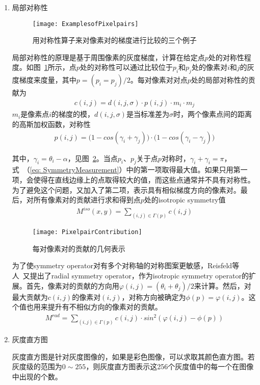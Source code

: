 \begin{enumerate}

\item 局部对称性

\begin{figure}[!ht]
 \centering
 \texttt{[image: ExamplesofPixelpairs]}
\caption{用对称性算子来对像素对的梯度进行比较的三个例子}
\label{fig: ExamplesofPixelpairs}
\end{figure}

局部对称性的原理是基于周围像素的灰度梯度，计算在给定点$p$处的对称性程度。如图~\ref{fig: ExamplesofPixelpairs}所示，点$p$处的对称性可以通过比较位于$p_i$和$p_j$处的像素对$i$和$j$的灰度梯度来度量，其中$p = (p_i  = p_j)/2$。每对像素对对点$p$处的局部对称性的贡献为
\begin{align}
c(i, j) = d(i, j, \sigma) \cdot p(i, j) \cdot m_i \cdot m_j
\end{align}
$m_i$是像素点$i$的梯度的模，$d(i, j, \sigma)$是当标准差为$\sigma$时，两个像素点间的距离的高斯加权函数，对称性
\begin{align}
p(i, j) = \Big(1-cos(\gamma_i+\gamma_j)\Big)\cdot \Big(1-cos(\gamma_i-\gamma_j)\Big)
\label{eq: SymmetryMeasurement}
\end{align}

其中，$\gamma_i = \theta_i-\alpha$，见图~\ref{fig: PixelpairContribution}。当点$p_i$、$p_j$关于点$p$对称时，$\gamma_i+\gamma_i=\pi$，式~（\ref{eq: SymmetryMeasurement}）中的第一项取得最大值。如果只用第一项，会使得在直线边缘上的点取得较大的值，而这些点通常并不具有对称性。为了避免这个问题，又加入了第二项，表示具有相似梯度方向的像素对。最后，对所有像素对的贡献进行求和得到点$p$处的isotropic symmetry值
\begin{align}
M^{iso}(x, y) = \sum_{(i, j)\in \Gamma(p)} c(i, j)
\label{eq: IsotropicSymmetry}
\end{align}

\begin{figure}[!ht]
 \centering
 \texttt{[image: PixelpairContribution]}
\caption{每对像素对的贡献的几何表示}
\label{fig: PixelpairContribution}
\end{figure}

为了使symmetry operator对有多个对称轴的对称图案更敏感，Reisfeld等人~\cite{reisfeld1995context}又提出了radial symmetry operator，作为isotropic symmetry operator的扩展。首先，像素对的贡献的方向用$\varphi(i, j) = (\theta_i+\theta_j)/2$来计算。然后，对最大贡献为$c(i, j)$的像素对$(i, j)$，对称方向被确定为$\phi(p) = \varphi(i, j)$。这个值也用来提升有不相似方向的像素对的贡献。
\begin{align}
M^{rad}= \sum_{(i, j)\in \Gamma(p)} c(i, j) \cdot sin^2(\varphi(i, j) - \phi(p))
\end{align}

\item 灰度直方图

灰度直方图是针对灰度图像的，如果是彩色图像，可以求取其颜色直方图。若灰度级的范围为$0 \sim 255$，则灰度直方图表示这256个灰度值中的每一个在图像中出现的个数。
\end{enumerate}


